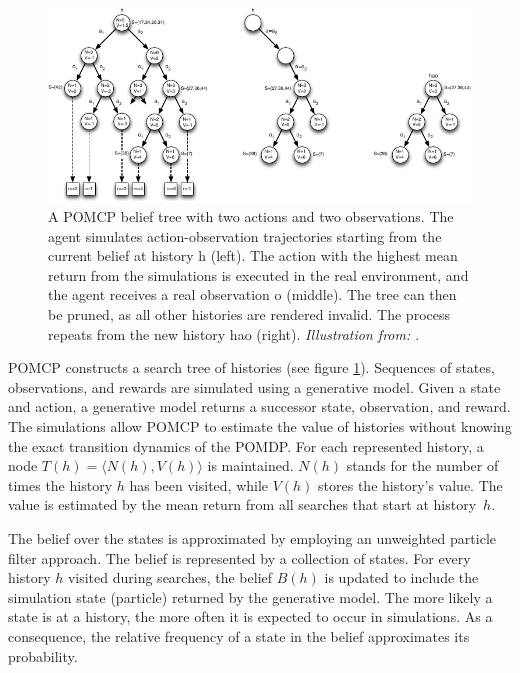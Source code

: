\begin{figure}[htbp]
    \centering
    \includegraphics[width=1.0\textwidth]{figures/POMCP_original.pdf}
    \caption[A POMCP belief tree]{A POMCP belief tree with two actions and two observations. The agent simulates action-observation trajectories starting from the current belief at history h (left). The action with the highest mean return from the simulations is executed in the real environment, and the agent receives a real observation o (middle). The tree can then be pruned, as all other histories are rendered invalid. The process repeats from the new history hao (right). \emph{Illustration from: \cite{pomcp}}.}
    \label{fig:pomcp_original}
\end{figure}


\noindent
POMCP constructs a search tree of histories (see figure \ref{fig:pomcp_original}). Sequences of states, observations, and rewards are simulated using a generative model. Given a state and action, a generative model returns a successor state, observation, and reward. The simulations allow POMCP to estimate the value of histories without knowing the exact transition dynamics of the POMDP. For each represented history, a node $T(h) = \langle N(h), V(h) \rangle$ is maintained. $N(h)$ stands for the number of times the history $h$ has been visited, while $V(h)$ stores the history's value. The value is estimated by the mean return from all searches that start at history~$h$. 

The belief over the states is approximated by employing an unweighted particle filter approach. The belief is represented by a collection of states. For every history $h$ visited during searches, the belief $B(h)$ is updated to include the simulation state (particle) returned by the generative model. The more likely a state is at a history, the more often it is expected to occur in simulations. As a consequence, the relative frequency of a state in the belief approximates its probability.

